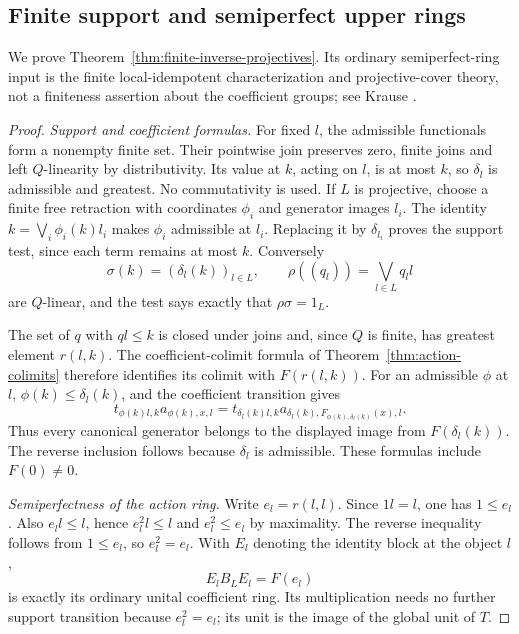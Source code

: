 \subsection{Finite support and semiperfect upper rings}\label{sec:finite-inverse}
We prove Theorem~\ref{thm:finite-inverse-projectives}. Its ordinary
semiperfect-ring input is the finite local-idempotent characterization
and projective-cover theory, not a finiteness assertion about the
coefficient groups; see Krause \cite[Proposition~4.1 and
Theorem~4.2]{Krause}.

\begin{proof}
\emph{Support and coefficient formulas.}
For fixed $l$, the admissible functionals form a nonempty finite set.
Their pointwise join preserves zero, finite joins and left $Q$-linearity
by distributivity. Its value at $k$, acting on $l$, is at most $k$,
so $\delta_l$ is admissible and greatest. No commutativity is used.
If $L$ is projective, choose a finite free retraction with coordinates
$\phi_i$ and generator images $l_i$. The identity
$k=\bigvee_i\phi_i(k)l_i$ makes $\phi_i$ admissible at $l_i$.
Replacing it by $\delta_{l_i}$ proves the support test, since each term
remains at most $k$. Conversely
\[
 \sigma(k)=(\delta_l(k))_{l\in L},\qquad
 \rho((q_l))=\bigvee_{l\in L}q_ll
\]
are $Q$-linear, and the test says exactly that $\rho\sigma=1_L$.

The set of $q$ with $ql\leq k$ is closed under joins and, since $Q$ is
finite, has greatest element $r(l,k)$. The coefficient-colimit formula
of Theorem~\ref{thm:action-colimits} therefore identifies its colimit
with $F(r(l,k))$. For an admissible $\phi$ at $l$,
$\phi(k)\leq\delta_l(k)$, and the coefficient transition gives
\[
 t_{\phi(k)l,k}a_{\phi(k),x,l}
 =t_{\delta_l(k)l,k}
   a_{\delta_l(k),F_{\phi(k),\delta_l(k)}(x),l}.
\]
Thus every canonical generator belongs to the displayed image from
$F(\delta_l(k))$. The reverse inclusion follows because $\delta_l$
is admissible. These formulas include $F(0)\ne0$.

\emph{Semiperfectness of the action ring.}
Write $e_l=r(l,l)$. Since $1l=l$, one has $1\leq e_l$. Also
$e_ll\leq l$, hence $e_l^2l\leq l$ and $e_l^2\leq e_l$ by
maximality. The reverse inequality follows from $1\leq e_l$, so
$e_l^2=e_l$. With $E_l$ denoting the identity block at the object $l$,
\[
 E_lB_LE_l=F(e_l)
\]
is exactly its ordinary unital coefficient ring. Its multiplication
needs no further support transition because $e_l^2=e_l$; its unit is
the image of the global unit of $T$.


\end{proof}
